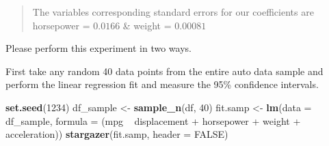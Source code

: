 \documentclass[]{article}
\newenvironment{Shaded}{\begin{snugshade}}{\end{snugshade}}
\newcommand{\KeywordTok}[1]{\textcolor[rgb]{0.13,0.29,0.53}{\textbf{{#1}}}}
\newcommand{\DataTypeTok}[1]{\textcolor[rgb]{0.13,0.29,0.53}{{#1}}}
\newcommand{\DecValTok}[1]{\textcolor[rgb]{0.00,0.00,0.81}{{#1}}}
\newcommand{\StringTok}[1]{\textcolor[rgb]{0.31,0.60,0.02}{{#1}}}
\newcommand{\OtherTok}[1]{\textcolor[rgb]{0.56,0.35,0.01}{{#1}}}
\newcommand{\NormalTok}[1]{{#1}}
\begin{document}
\begin{quote}
The variables corresponding standard errors for our coefficients are
horsepower = \(0.0166\) \& weight = \(0.00081\)
\end{quote}

\newpage

Please perform this experiment in two ways.

First take any random 40 data points from the entire auto data sample
and perform the linear regression fit and measure the 95\% confidence
intervals.

\begin{Shaded}
\begin{Highlighting}[]
\KeywordTok{set.seed}\NormalTok{(}\DecValTok{1234}\NormalTok{)}
\NormalTok{df_sample <-}\StringTok{ }\KeywordTok{sample_n}\NormalTok{(df, }\DecValTok{40}\NormalTok{)}
\NormalTok{fit.samp <-}\StringTok{ }\KeywordTok{lm}\NormalTok{(}\DataTypeTok{data =} \NormalTok{df_sample, }\DataTypeTok{formula =} \NormalTok{(mpg ~}\StringTok{ }\NormalTok{displacement +}
\StringTok{                                              }\NormalTok{horsepower +}\StringTok{ }\NormalTok{weight +}\StringTok{ }\NormalTok{acceleration))}
\KeywordTok{stargazer}\NormalTok{(fit.samp, }\DataTypeTok{header =} \OtherTok{FALSE}\NormalTok{)}
\end{Highlighting}
\end{Shaded}
\end{document}
